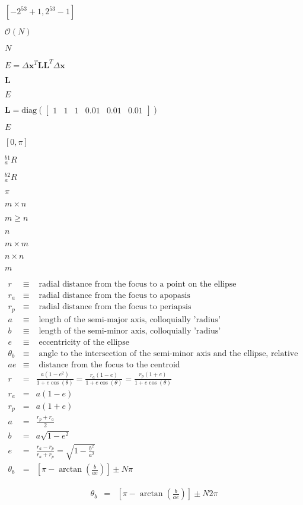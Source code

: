 \documentclass{article}
\begin{document}
$[-2^{53}+1, 2^{53}-1]$
\pagebreak

$ \mathcal{O}(N) $
\pagebreak

$N$
\pagebreak

$ E = \Delta \mathbf{x}^T \mathbf{L} \mathbf{L}^T \Delta \mathbf{x} $
\pagebreak

$\mathbf{L}$
\pagebreak

$E$
\pagebreak

$\mathbf{L} = \mathrm{diag}\left( \begin{bmatrix} 1 & 1 & 1 & 0.01 & 0.01 & 0.01 \end{bmatrix} \right) $
\pagebreak

$ E $
\pagebreak

$ [0 , \pi] $
\pagebreak

$ _a^{b1} R  $
\pagebreak

$ _a^{b2} R $
\pagebreak

$ \pi $
\pagebreak

$m \times n$
\pagebreak

$ m \geq n $
\pagebreak

$n$
\pagebreak

$m \times m$
\pagebreak

$n \times n$
\pagebreak

$m$
\pagebreak

\begin{eqnarray*}
       r &\equiv& \textrm{ radial distance from the focus to a point on the ellipse}\\
       r_a &\equiv& \textrm{ radial distance from the focus to apopasis}\\
       r_p &\equiv& \textrm{ radial distance from the focus to periapsis}\\
       a &\equiv& \textrm{ length of the semi-major axis, colloquially 'radius'}\\
       b &\equiv& \textrm{ length of the semi-minor axis, colloquially 'radius'}\\
       e &\equiv& \textrm{ eccentricity of the ellipse}\\
       \theta_b &\equiv& \textrm{ angle to the intersection of the semi-minor axis and the ellipse, relative to the focus}\\
       ae &\equiv& \textrm{ distance from the focus to the centroid}\\
       r &=& \frac{a(1-e^2)}{1+e\cos(\theta)} = \frac{r_a(1-e)}{1+e\cos(\theta)} = \frac{r_p(1+e)}{1+e\cos(\theta)}\\
       r_a &=& a(1-e)\\
       r_p &=& a(1+e)\\
       a &=& \frac{r_p+r_a}{2}\\
       b &=& a\sqrt{1-e^2}\\
       e &=& \frac{r_a-r_p}{r_a+r_p} = \sqrt{1-\frac{b^2}{a^2}}\\
       \theta_b &=& \left[\pi - \arctan\left(\frac{b}{ae}\right)\right] \pm N\pi
  \end{eqnarray*}
\pagebreak

\begin{eqnarray*}
       \theta_b &=& \left[\pi - \arctan\left(\frac{b}{ae}\right)\right]  \pm N 2\pi
  \end{eqnarray*}
\pagebreak
\end{document}
